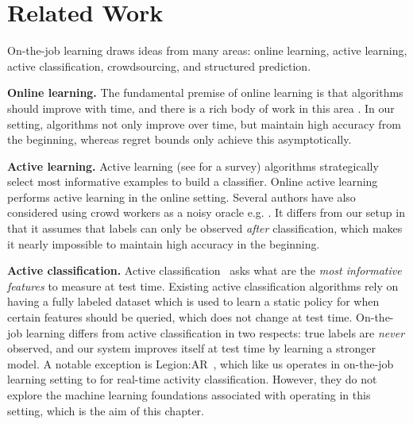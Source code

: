 \section{Related Work}
\label{sec:related}


On-the-job learning draws ideas from many areas:
online learning, active learning, active classification, crowdsourcing, and structured
prediction.


\textbf{Online learning.}
The fundamental premise of online learning is that algorithms should improve
with time, and there is a rich body of work in this area \citep{cesabianchi06prediction}.
In our setting, algorithms not only improve over time, but maintain high accuracy from the beginning,
whereas regret bounds only achieve this asymptotically.

\textbf{Active learning.}
Active learning (see \citet{settles2010active} for a survey) algorithms
strategically select most informative examples to build a classifier.
Online active learning
\citep{helmbold1997some,sculley2007online,chu2011unbiased}
performs active learning in the online setting.
Several authors have also considered using crowd workers as a noisy oracle
e.g. \citep{donmez2008proactive,golovin2010near}. %
It differs from our setup in that 
it assumes that labels can only be observed {\em after} classification,
which makes it nearly impossible to maintain high accuracy in the beginning.


\textbf{Active classification.}
Active classification~\citet{greiner2002learning,chai2004test,esmeir2007anytime}
asks what are the {\em most informative features} to measure at test time.
Existing active classification algorithms rely on having a fully labeled
dataset which is used to learn a static policy for when certain features should
be queried, which does not change at test time.
On-the-job learning differs from active classification in two respects: true
labels are {\em never} observed, and our system improves itself at test
time by learning a stronger model.
A notable exception is Legion:AR~\citet{lasecki2013realtime},
which like us operates in on-the-job learning setting
to for real-time activity classification.
However, they do not explore the machine learning foundations associated
with operating in this setting, which is the aim of this chapter.

